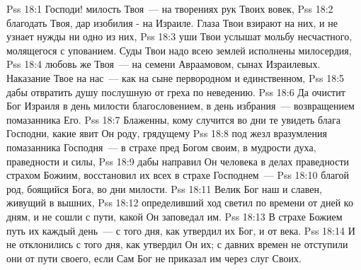 \vs Pss 18:1
Господи! милость Твоя~--- на творениях рук Твоих вовек,
\vs Pss 18:2
благодать Твоя, дар изобилия - на Израиле.
Глаза Твои взирают на них, и не узнает нужды ни одно из них,
\vs Pss 18:3
уши Твои услышат мольбу несчастного, молящегося с упованием.
Суды Твои надо всею землей исполнены милосердия,
\vs Pss 18:4
любовь же Твоя~--- на семени Авраамовом, сынах
Израилевых.
Наказание Твое на нас~--- как на сыне первородном и единственном,
\vs Pss 18:5
дабы отвратить душу послушную от греха по неведению.
\vs Pss 18:6
Да очистит Бог Израиля в день милости благословением, в день
избрания~--- возвращением помазанника Его.
\vs Pss 18:7
Блаженны, кому случится во дни те увидеть блага Господни, какие
явит Он роду, грядущему
\vs Pss 18:8
под жезл вразумления помазанника Господня~--- в страхе пред
Богом своим, в мудрости духа, праведности и силы,
\vs Pss 18:9
дабы направил Он человека в делах праведности страхом Божиим,
восстановил их всех в страхе Господнем~---
\vs Pss 18:10
благой род, боящийся Бога, во дни милости.
\vs Pss 18:11
Велик Бог наш и славен, живущий в вышних,
\vs Pss 18:12
определивший ход светил по времени от дней ко дням, и не сошли с
пути, какой Он заповедал им.
\vs Pss 18:13
В страхе Божием путь их каждый день~--- с того дня, как утвердил
их Бог, и от века.
\vs Pss 18:14
И не отклонились с того дня, как утвердил Он их; с давних времен не
отступили они от пути своего, если Сам Бог не приказал им через слуг Своих.
